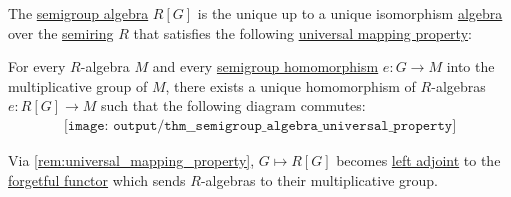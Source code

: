\begin{theorem}\label{thm:semigroup_algebra_universal_property}
  The \hyperref[def:semigroup_algebra]{semigroup algebra} \( R[G] \) is the unique up to a unique isomorphism \hyperref[def:algebra_over_semiring]{algebra} over the \hyperref[def:semiring]{semiring} \( R \) that satisfies the following \hyperref[rem:universal_mapping_property]{universal mapping property}:
  \begin{displayquote}
    For every \( R \)-algebra \( M \) and every \hyperref[def:semigroup/homomorphism]{semigroup homomorphism} \( e: G \to M \) into the multiplicative group of \( M \), there exists a unique homomorphism of \( R \)-algebras \( e: R[G] \to M \) such that the following diagram commutes:
    \begin{equation}\label{eq:thm:semigroup_algebra_universal_property}
      \begin{aligned}
        \texttt{[image: output/thm\_\_semigroup\_algebra\_universal\_property]}
      \end{aligned}
    \end{equation}
  \end{displayquote}
\end{theorem}
\begin{comments}
  \item Via \cref{rem:universal_mapping_property}, \( G \mapsto R[G] \) becomes \hyperref[def:category_adjunction]{left adjoint} to the \hyperref[def:concrete_category]{forgetful functor} which sends \( R \)-algebras to their multiplicative group.
\end{comments}
